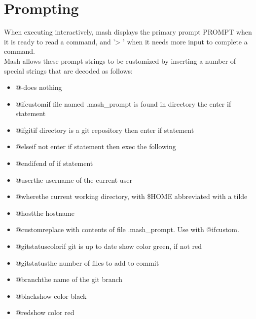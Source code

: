 \documentclass[12pt,a4paper]{report}
\begin{document}
\part{Prompting}
\setcounter{chapter}{0}
When  executing  interactively, mash displays the primary prompt PROMPT when it is ready to read a command, and '> ' when it needs more input to complete a command.\\
Mash allows these prompt strings to be customized by inserting a number of special strings that are decoded as follows:
\begin{itemize}
	\item @-\hspace{7 mm}does nothing
	\item @ifcustom\hspace{7 mm}if file named .mash\_prompt is found in directory the enter if statement
	\item @ifgit\hspace{7 mm}if directory is a git repository then enter if statement
	\item @else\hspace{7 mm}if not enter if statement then exec the following
	\item @endif\hspace{7 mm}end of if statement
	\item @user\hspace{7 mm}the username of the current user
	\item @where\hspace{7 mm}the current working directory, with \$HOME abbreviated with a tilde
	\item @host\hspace{7 mm}the hostname
	\item @custom\hspace{7 mm}replace with contents of file .mash\_prompt. Use with @ifcustom.
	\item @gitstatuscolor\hspace{7 mm}if git is up to date show color green, if not red
	\item @gitstatus\hspace{7 mm}the number of files to add to commit
	\item @branch\hspace{7 mm}the name of the git branch
	\item @black\hspace{7 mm}show color black
	\item @red\hspace{7 mm}show color red

\end{itemize}
\end{document}
